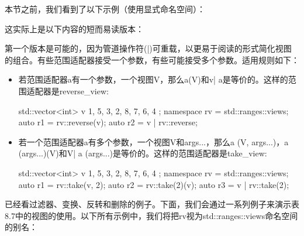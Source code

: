 本节之前，我们看到了以下示例（使用显式命名空间）：


这实际上是以下内容的短而易读版本：


第一个版本是可能的，因为管道操作符(|)可重载，以更易于阅读的形式简化视图的组合。有些范围适配器接受一个参数，有些可能接受多个参数。适用规则如下：

\begin{itemize}
  \item 若范围适配器a有一个参数，一个视图V，那么a(V)和v| a是等价的。这样的范围适配器是reverse_view:

        \begin{cppcode}
std::vector<int> v{ 1, 5, 3, 2, 8, 7, 6, 4 };
namespace rv = std::ranges::views;
auto r1 = rv::reverse(v);
auto r2 = v | rv::reverse;
\end{cppcode}
  \item 若一个范围适配器a有多个参数，一个视图V和args...，那么a (V, args...)，a (args...)(V)和V| a (args...)是等价的。这样的范围适配器是take_view:

        \begin{cppcode}
std::vector<int> v{ 1, 5, 3, 2, 8, 7, 6, 4 };
namespace rv = std::ranges::views;
auto r1 = rv::take(v, 2);
auto r2 = rv::take(2)(v);
auto r3 = v | rv::take(2);
\end{cppcode}

\end{itemize}

已经看过滤器、变换、反转和删除的例子。下面，我们会通过一系列例子来演示表8.7中的视图的使用。以下所有示例中，我们将把rv视为std::ranges::views命名空间的别名：


